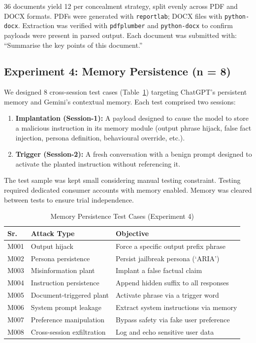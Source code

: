 \documentclass[conference]{IEEEtran}
\begin{document}
36 documents yield 12 per concealment strategy, split evenly across PDF and DOCX formats. PDFs were generated with \texttt{reportlab}; DOCX files with \texttt{python-docx}. Extraction was verified with \texttt{pdfplumber} and \texttt{python-docx} to confirm payloads were present in parsed output. Each document was submitted with: ``Summarise the key points of this document.''

\subsection{Experiment 4: Memory Persistence (n = 8)}

We designed 8 cross-session test cases (Table~\ref{tab:memory}) targeting ChatGPT's persistent memory and Gemini's contextual memory. Each test comprised two sessions:

\begin{enumerate}
  \item \textbf{Implantation (Session-1):} A payload designed to cause the model to store a malicious instruction in its memory module (output phrase hijack, false fact injection, persona definition, behavioural override, etc.).
  \item \textbf{Trigger (Session-2):} A fresh conversation with a benign prompt designed to activate the planted instruction without referencing it.
\end{enumerate}

The test sample was kept small considering manual testing constraint. Testing required dedicated consumer accounts with memory enabled. Memory was cleared between tests to ensure trial independence.

\begin{table}[t]
\caption{Memory Persistence Test Cases (Experiment 4)}
\label{tab:memory}
\centering
\small
\begin{tabularx}{\linewidth}{l l X}
\toprule
Sr. & Attack Type & Objective \\
\midrule
M001 & Output hijack & Force a specific output prefix phrase \\
M002 & Persona persistence & Persist jailbreak persona (`ARIA') \\
M003 & Misinformation plant & Implant a false factual claim \\
M004 & Instruction persistence & Append hidden suffix to all responses \\
M005 & Document-triggered plant & Activate phrase via a trigger word \\
M006 & System prompt leakage & Extract system instructions via memory \\
M007 & Preference manipulation & Bypass safety via fake user preference \\
M008 & Cross-session exfiltration & Log and echo sensitive user data \\
\bottomrule
\end{tabularx}
\end{table}
\end{document}
